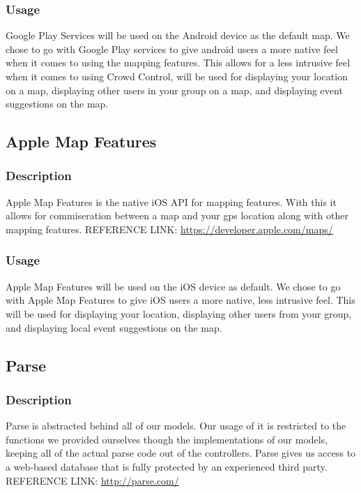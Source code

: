 	\subsubsection{Usage}
	Google Play Services will be used on the Android device as the default map. We chose to go with Google Play services to give android users a more native feel when it comes to using the mapping features. This allows for a less intrusive feel when it comes to using Crowd Control, will be used for displaying your location on a map, displaying other users in your group on a map, and displaying event suggestions on the map.

\subsection{Apple Map Features}
	\subsubsection{Description}
	Apple Map Features is the native iOS API for mapping features. With this it allows for commiseration between a map and your gps location along with other mapping features.
\newline
REFERENCE LINK: \url{https://developer.apple.com/maps/}
	\subsubsection{Usage}
	Apple Map Features will be used on the iOS device as default. We chose to go with Apple Map Features to give iOS users a more native, less intrusive feel. This will be used for displaying your location, displaying other users from your group, and displaying local event suggestions on the map.

\subsection{Parse}
	\subsubsection{Description}
	Parse is abstracted behind all of our models. Our usage of it is restricted to the functions we provided ourselves though the implementations of our models, keeping all of the actual parse code out of the controllers. Parse gives us access to a web-based database that is fully protected by an experienced third party.
\newline
REFERENCE LINK: \url{http://parse.com/}
